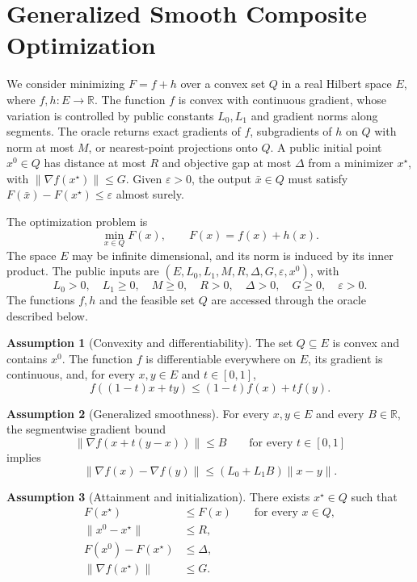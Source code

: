 \documentclass[10pt]{article}
\theoremstyle{definition}
\newtheorem{assumption}{Assumption}
\begin{document}
\section*{Generalized Smooth Composite Optimization}
We consider minimizing $F=f+h$ over a convex set $Q$ in a real Hilbert space $E$, where $f,h:E\to\mathbb{R}$. The function $f$ is convex with continuous gradient, whose variation is controlled by public constants $L_0,L_1$ and gradient norms along segments. The oracle returns exact gradients of $f$, subgradients of $h$ on $Q$ with norm at most $M$, or nearest-point projections onto $Q$. A public initial point $x^0\in Q$ has distance at most $R$ and objective gap at most $\Delta$ from a minimizer $x^\star$, with $\|\nabla f(x^\star)\|\leq G$. Given $\varepsilon>0$, the output $\bar{x}\in Q$ must satisfy $F(\bar{x})-F(x^\star)\leq\varepsilon$ almost surely.

The optimization problem is
\[
\min_{x\in Q} F(x),\qquad F(x)=f(x)+h(x).
\]
The space $E$ may be infinite dimensional, and its norm is induced by its inner product. The public inputs are $(E,L_0,L_1,M,R,\Delta,G,\varepsilon,x^0)$, with
\[
L_0>0,\quad L_1\geq0,\quad M\geq0,\quad R>0,\quad
\Delta>0,\quad G\geq0,\quad \varepsilon>0.
\]
The functions $f,h$ and the feasible set $Q$ are accessed through the oracle described below.

\begin{assumption}[Convexity and differentiability]
The set $Q\subseteq E$ is convex and contains $x^0$. The function $f$ is differentiable everywhere on $E$, its gradient is continuous, and, for every $x,y\in E$ and $t\in[0,1]$,
\[
f((1-t)x+ty)\leq(1-t)f(x)+tf(y).
\]
\end{assumption}

\begin{assumption}[Generalized smoothness]
For every $x,y\in E$ and every $B\in\mathbb{R}$, the segmentwise gradient bound
\[
\|\nabla f(x+t(y-x))\|\leq B
\qquad\text{for every }t\in[0,1]
\]
implies
\[
\|\nabla f(x)-\nabla f(y)\|
\leq (L_0+L_1 B)\|x-y\|.
\]
\end{assumption}

\begin{assumption}[Attainment and initialization]
There exists $x^\star\in Q$ such that
\begin{align*}
F(x^\star)&\leq F(x)\qquad\text{for every }x\in Q,\\
\|x^0-x^\star\|&\leq R,\\
F(x^0)-F(x^\star)&\leq\Delta,\\
\|\nabla f(x^\star)\|&\leq G.
\end{align*}
\end{assumption}
\end{document}
